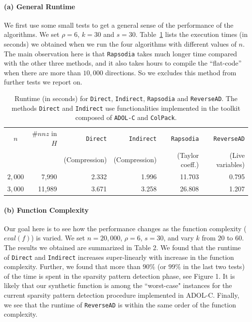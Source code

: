 \documentclass[10pt, a4paper, english]{article}
\begin{document}
\paragraph{(a) General Runtime} 
We first use some small tests to get a general sense of the performance of the algorithms. We set $\rho = 6$, $k = 30$ and $s = 30$. 
Table~\ref{tab:general} lists the execution times (in seconds) we obtained when
we run the four algorithms with different values of $n$.  The main observation here is that
{\tt Rapsodia} takes much longer time compared with the other three methods, and it also takes hours to compile the ``flat-code'' when there are more than $10,000$ directions. 
So we excludes this method from further tests we report on.
\begin{table}[htbp]
\begin{center}
\begin{tabular}{ | c | r | r | r | r | r |}
\hline
$n$ & $\#nnz$ in $H$ & {\tt Direct} & {\tt Indirect} & {\tt Rapsodia} & {\tt ReverseAD} \\
       &                          & (Compression) & (Compression) & (Taylor coeff.) & (Live variables) \\ 
\hline
$2,000$ & 7,990 & 2.332 & 1.996 & 11.703 & 0.795 \\
$3,000$ & 11,989 & 3.671 & 3.258 & 26.808 & 1.207\\
\hline 
\end{tabular}
\end{center}
\caption{Runtime (in seconds) for {\tt Direct}, {\tt Indirect}, {\tt Rapsodia} and {\tt ReverseAD}. The methods {\tt Direct} and {\tt Indirect} use functionalities implemented in the toolkit composed of {\tt ADOL-C} and {\tt ColPack}.} 
\label{tab:general}
\end{table}

\paragraph{(b) Function Complexity} 
Our goal here is to see how the performance changes as the function complexity ($eval(f)$) 
is varied. We set $n = 20,000$, $\rho = 6$, $s = 30$, and vary $k$ from $20$ to $60$. 
The results we obtained are summarized in Table 2.
We found that the runtime of {\tt Direct} and {\tt Indirect} increases super-linearly with increase in the function complexity. Further, we found that more than $90\%$ (or $99\%$ in the last two tests) of the time is spent in the sparsity pattern detection phase, see Figure 1. It is likely that our synthetic function is among the ``worst-case" instances for the current sparsity pattern detection procedure implemented in ADOL-C.  Finally, we see that the runtime of {\tt ReverseAD} is within the same order of the function complexity.
\end{document}
